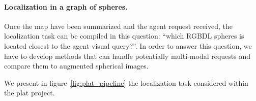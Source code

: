 \paragraph{Localization in a graph of spheres.}
Once the map have been summarized and the agent request received, the localization task can be compiled in this question: ``which RGBDL spheres is located closest to the agent visual query?''. In order to answer this question, we have to develop methods that can handle potentially multi-modal requests and compare them to augmented spherical images.



We present in figure~\ref{fig:plat_pipeline} the localization task considered within the \ac{plat} project.